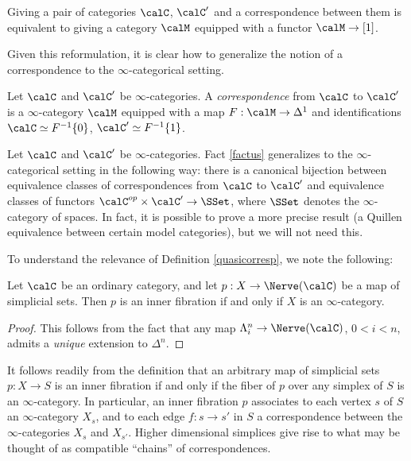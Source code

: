 \begin{fact}\label{factus}
Giving a pair of categories $\calC$, $\calC'$ and a correspondence between them is equivalent to giving a category $\calM$ equipped with a functor $\calM \rightarrow [1]$.
\end{fact}

Given this reformulation, it is clear how to generalize the notion of a correspondence to the $\infty$-categorical setting.

\begin{definition}\label{quasicorresp}
Let $\calC$ and $\calC'$ be $\infty$-categories. A {\it correspondence} from $\calC$ to $\calC'$ is a $\infty$-category $\calM$ equipped with a map $F: \calM \rightarrow \Delta^1$ and identifications $\calC \simeq F^{-1} \{0\}$, $\calC' \simeq F^{-1} \{1\}$. 
\end{definition}

\begin{remark}
Let $\calC$ and $\calC'$ be $\infty$-categories. Fact \ref{factus} generalizes to the $\infty$-categorical setting in the following way: there is a canonical bijection between equivalence classes of correspondences from $\calC$ to $\calC'$ and equivalence classes of functors
$\calC^{op} \times \calC' \rightarrow \SSet$, where $\SSet$ denotes the $\infty$-category of spaces.
In fact, it is possible to prove a more precise result (a Quillen equivalence between certain model categories), but we will not need this.
\end{remark}

To understand the relevance of Definition \ref{quasicorresp}, we note the following:

\begin{proposition}
Let $\calC$ be an ordinary category, and let $p: X \rightarrow \Nerve(\calC)$ be a
map of simplicial sets. Then $p$ is an inner fibration if and only if
$X$ is an $\infty$-category.
\end{proposition}

\begin{proof}
This follows from the fact that any map $\Lambda^n_i \rightarrow
\Nerve(\calC)$, $0 < i < n$, admits a {\em unique} extension to
$\Delta^n$.
\end{proof}

It follows readily from the definition that an arbitrary map of simplicial sets $p: X \rightarrow S$
is an inner fibration if and only if the fiber of $p$ over any
simplex of $S$ is an $\infty$-category. In particular, an inner fibration $p$
associates to each vertex $s$ of $S$ an $\infty$-category $X_{s}$, and to each edge $f: s \rightarrow s'$ in $S$ a correspondence
between the $\infty$-categories $X_{s}$ and $X_{s'}$. Higher dimensional simplices give
rise to what may be thought of as compatible ``chains'' of
correspondences.

